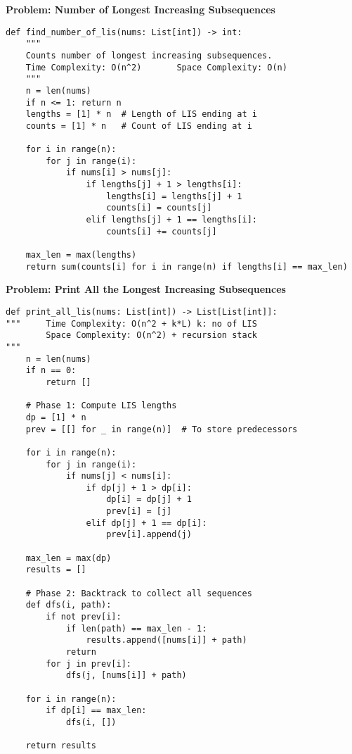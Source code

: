 \noindent\textbf{Problem: Number of Longest Increasing Subsequences}
\begin{verbatim}
def find_number_of_lis(nums: List[int]) -> int:
    """
    Counts number of longest increasing subsequences.
    Time Complexity: O(n^2)       Space Complexity: O(n)
    """
    n = len(nums)
    if n <= 1: return n
    lengths = [1] * n  # Length of LIS ending at i
    counts = [1] * n   # Count of LIS ending at i
    
    for i in range(n):
        for j in range(i):
            if nums[i] > nums[j]:
                if lengths[j] + 1 > lengths[i]:
                    lengths[i] = lengths[j] + 1
                    counts[i] = counts[j]
                elif lengths[j] + 1 == lengths[i]:
                    counts[i] += counts[j]
    
    max_len = max(lengths)
    return sum(counts[i] for i in range(n) if lengths[i] == max_len)
\end{verbatim}
\noindent\textbf{Problem: Print All the  Longest Increasing Subsequences}
\begin{verbatim}
def print_all_lis(nums: List[int]) -> List[List[int]]:
"""     Time Complexity: O(n^2 + k*L) k: no of LIS       
        Space Complexity: O(n^2) + recursion stack
"""
    n = len(nums)
    if n == 0:
        return []

    # Phase 1: Compute LIS lengths
    dp = [1] * n
    prev = [[] for _ in range(n)]  # To store predecessors

    for i in range(n):
        for j in range(i):
            if nums[j] < nums[i]:
                if dp[j] + 1 > dp[i]:
                    dp[i] = dp[j] + 1
                    prev[i] = [j]
                elif dp[j] + 1 == dp[i]:
                    prev[i].append(j)

    max_len = max(dp)
    results = []

    # Phase 2: Backtrack to collect all sequences
    def dfs(i, path):
        if not prev[i]:
            if len(path) == max_len - 1:
                results.append([nums[i]] + path)
            return
        for j in prev[i]:
            dfs(j, [nums[i]] + path)

    for i in range(n):
        if dp[i] == max_len:
            dfs(i, [])

    return results
\end{verbatim}
